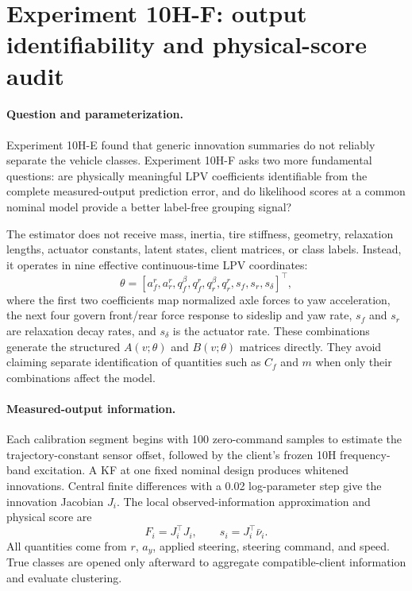 \section{Experiment 10H-F: output identifiability and physical-score audit}
\label{sec:experiment10hf}

\paragraph{Question and parameterization.}
Experiment 10H-E found that generic innovation summaries do not reliably
separate the vehicle classes. Experiment 10H-F asks two more fundamental
questions: are physically meaningful LPV coefficients identifiable from the
complete measured-output prediction error, and do likelihood scores at a
common nominal model provide a better label-free grouping signal?

The estimator does not receive mass, inertia, tire stiffness, geometry,
relaxation lengths, actuator constants, latent states, client matrices, or
class labels. Instead, it operates in nine effective continuous-time LPV
coordinates:
\begin{equation}
 \theta=[a_f^r,a_r^r,q_f^\beta,q_f^r,q_r^\beta,q_r^r,
          s_f,s_r,s_\delta]^\top,
\end{equation}
where the first two coefficients map normalized axle forces to yaw
acceleration, the next four govern front/rear force response to sideslip and
yaw rate, $s_f$ and $s_r$ are relaxation decay rates, and $s_\delta$ is the
actuator rate. These combinations generate the structured $A(v;\theta)$ and
$B(v;\theta)$ matrices directly. They avoid claiming separate identification
of quantities such as $C_f$ and $m$ when only their combinations affect the
model.

\paragraph{Measured-output information.}
Each calibration segment begins with 100 zero-command samples to estimate the
trajectory-constant sensor offset, followed by the client's frozen 10H
frequency-band excitation. A KF at one fixed nominal design produces whitened
innovations. Central finite differences with a 0.02 log-parameter step give
the innovation Jacobian $J_i$. The local observed-information approximation
and physical score are
\begin{equation}
 F_i=J_i^\top J_i,
 \qquad s_i=J_i^\top\bar\nu_i.
\end{equation}
All quantities come from $r$, $a_y$, applied steering, steering command, and
speed. True classes are opened only afterward to aggregate compatible-client
information and evaluate clustering.

